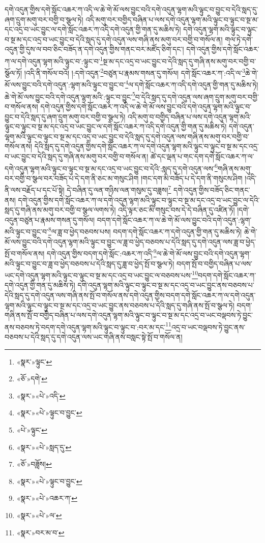 དགེ་འདུན་གྱིས་དགེ་སློང་འཆར་ཀ་འདི་ལ་ཆེ་གེ་མོ་ལས་བྱུང་བའི་དགེ་འདུན་ལྷག་མའི་ལྟུང་བ་བྱུང་བ་དེའི་སླད་དུ་ཞག་དྲུག་མགུ་བར་བགྱི་བ་སྩལ་ཏེ། འདི་མགུ་བར་བགྱིད་བཞིན་པ་ལས་དགེ་འདུན་ལྷག་མའི་ལྟུང་བ་ལྟུང་བ་སྔ་མ་དང་འདྲ་བ་ཡང་བྱུང་ལ་དགེ་སློང་འཆར་ཀ་འདི་དགེ་འདུན་གྱི་གན་དུ་མཆིས་ཏེ། དགེ་འདུན་ལྷག་མའི་ལྟུང་བ་ལྟུང་བ་སྔ་མ་དང་འདྲ་བ་ཡང་བྱུང་བ་དེའི་སླད་དུ་དགེ་འདུན་ལས་གཞི་ནས་མགུ་བར་བགྱི་བ་གསོལ་ན། གལ་ཏེ་དགེ་འདུན་གྱི་དུས་ལ་བབ་ཅིང་བཟོད་ན་དགེ་འདུན་གྱིས་གནང་བར་མཛོད་ཅིག་དང་། དགེ་འདུན་གྱིས་དགེ་སློང་འཆར་ཀ་ལ་དགེ་འདུན་ལྷག་མའི་ལྟུང་བ་:ལྟུང་བ་\footnote{«སྣར་»ལྟུང་}སྔ་མ་དང་འདྲ་བ་ཡང་བྱུང་བ་དེའི་སླད་དུ་གཞི་ནས་མགུ་བར་བགྱི་བ་སྩོལ་ཏོ། །འདི་ནི་གསོལ་བའོ། །:དགེ་འདུན་\footnote{«ཅོ་»དགེ་}བཙུན་པ་རྣམས་གསན་དུ་གསོལ། དགེ་སློང་འཆར་ཀ་:འདི་ལ་\footnote{«སྣར་»«པེ་»འདི་}ཆེ་གེ་མོ་ལས་བྱུང་བའི་དགེ་འདུན་:ལྷག་མའི་ལྟུང་བ་བྱུང་བ་\footnote{«སྣར་»«པེ་»ལྟུང་བ་བྱུང་}ལ་དགེ་སློང་འཆར་ཀ་འདི་དགེ་འདུན་གྱི་གན་དུ་མཆིས་ཏེ། ཆེ་གེ་མོ་ལས་བྱུང་བའི་དགེ་འདུན་ལྷག་མའི་:ལྟུང་བ་བྱུང་\footnote{«པེ་»ལྟུང་}བ་དེའི་སླད་དུ་དགེ་འདུན་ལས་ཞག་དྲུག་མགུ་བར་བགྱི་བ་གསོལ་ནས། དགེ་འདུན་གྱིས་དགེ་སློང་འཆར་ཀ་འདི་ལ་ཆེ་གེ་མོ་ལས་བྱུང་བའི་དགེ་འདུན་ལྷག་མའི་ལྟུང་བ་བྱུང་བ་དེའི་སླད་དུ་ཞག་དྲུག་མགུ་བར་བགྱི་བ་སྩལ་ཏེ། འདི་མགུ་བ་བགྱིད་བཞིན་པ་ལས་དགེ་འདུན་ལྷག་མའི་ལྟུང་བ་ལྟུང་བ་སྔ་མ་དང་འདྲ་བ་ཡང་བྱུང་ལ་དགེ་སློང་འཆར་ཀ་འདི་དགེ་འདུན་གྱི་གན་དུ་མཆིས་ཏེ། དགེ་འདུན་ལྷག་མའི་ལྟུང་བ་ལྟུང་བ་སྔ་མ་དང་འདྲ་བ་ཡང་བྱུང་བ་དེའི་སླད་དུ་དགེ་འདུན་ལས་གཞི་ནས་མགུ་བར་བགྱི་བ་གསོལ་ནས། དེའི་སླད་དུ་དགེ་འདུན་གྱིས་དགེ་སློང་འཆར་ཀ་ལ་དགེ་འདུན་ལྷག་མའི་ལྟུང་བ་ལྟུང་བ་སྔ་མ་དང་འདྲ་བ་ཡང་བྱུང་བ་དེའི་སླད་དུ་གཞི་ནས་མགུ་བར་བགྱི་བ་གསོལ་ན། ཚེ་དང་ལྡན་པ་གང་དག་དགེ་སློང་འཆར་ཀ་ལ་དགེ་འདུན་ལྷག་མའི་ལྟུང་བ་ལྟུང་བ་སྔ་མ་དང་འདྲ་བ་ཡང་བྱུང་བ་དེའི་:སླད་དུ་དགེ་འདུན་ལས་\footnote{«སྣར་»«པེ་»སླད་དུ་}གཞི་ནས་མགུ་བར་བགྱི་བ་སྩལ་བར་བཟོད་པ་དེ་དག་ནི་ཅང་མ་གསུང་ཤིག །གང་དག་མི་བཟོད་པ་དེ་དག་ནི་གསུངས་ཤིག །འདི་ནི་ལས་བརྗོད་པ་དང་པོ་སྟེ། དེ་བཞིན་དུ་ལན་གཉིས་ལན་གསུམ་དུ་བཟླས།\footnote{«ཅོ་»བཟློས།} དགེ་འདུན་གྱིས་བཟོད་ཅིང་གནང་ནས། དགེ་འདུན་གྱིས་དགེ་སློང་འཆར་ཀ་ལ་དགེ་འདུན་ལྷག་མའི་ལྟུང་བ་ལྟུང་བ་སྔ་མ་དང་འདྲ་བ་ཡང་བྱུང་ལ་དེའི་སླད་དུ་གཞི་ནས་མགུ་བར་བགྱི་བ་སྩལ་ལགས་ཏེ། འདི་ལྟར་ཅང་མི་གསུང་བས་དེ་དེ་བཞིན་དུ་འཛིན་ཏོ། །དགེ་འདུན་བཙུན་པ་རྣམས་གསན་དུ་གསོལ། བདག་དགེ་སློང་འཆར་ཀ་ལ་ཆེ་གེ་མོ་ལས་བྱུང་བའི་དགེ་འདུན་:ལྷག་མའི་ལྟུང་བ་བྱུང་བ་\footnote{«སྣར་»«པེ་»ལྟུང་བ་བྱུང་}ལ་ཟླ་བ་ཕྱེད་བཅབས་པས། བདག་དགེ་སློང་འཆར་ཀ་དགེ་འདུན་གྱི་གན་དུ་མཆིས་ཏེ། ཆེ་གེ་མོ་ལས་བྱུང་བའི་དགེ་འདུན་ལྷག་མའི་ལྟུང་བ་བྱུང་ལ་ཟླ་བ་ཕྱེད་བཅབས་པ་དེའི་སླད་དུ་དགེ་འདུན་ལས་ཟླ་བ་ཕྱེད་སྤོ་བ་གསོལ་ནས། དགེ་འདུན་གྱིས་བདག་དགེ་སློང་:འཆར་ཀ་འདི་\footnote{«སྣར་»«པེ་»འཆར་ཀ་}ལ་ཆེ་གེ་མོ་ལས་བྱུང་བའི་དགེ་འདུན་ལྷག་མའི་ལྟུང་བ་བྱུང་བ་ཟླ་བ་ཕྱེད་བཅབས་པ་དེའི་སླད་དུ་ཟླ་བ་ཕྱེད་སྤོ་བ་སྩལ་ཏེ། བདག་སྤོ་བ་བགྱིད་བཞིན་པ་ལས་ཡང་དགེ་འདུན་ལྷག་མའི་ལྟུང་བ་ལྟུང་བ་སྔ་མ་དང་འདྲ་བ་ཡང་བྱུང་ལ་བཅབས་པས་\footnote{«སྣར་»«པེ་»ལ་}བདག་དགེ་སློང་འཆར་ཀ་དགེ་འདུན་གྱི་གན་དུ་མཆིས་ཏེ། དགེ་འདུན་ལྷག་མའི་ལྟུང་བ་ལྟུང་བ་སྔ་མ་དང་འདྲ་བ་ཡང་བྱུང་ནས་བཅབས་པ་དེའི་སླད་དུ་དགེ་འདུན་ལས་གཞི་ནས་སྤོ་བ་གསོལ་ནས་དགེ་འདུན་གྱིས་བདག་དགེ་སློང་འཆར་ཀ་ལ་དགེ་འདུན་ལྷག་མའི་ལྟུང་བ་ལྟུང་བ་སྔ་མ་དང་འདྲ་བ་ཡང་བྱུང་ནས་བཅབས་པ་དེའི་སླད་དུ་གཞི་ནས་སྤོ་བ་སྩལ་ཏེ། བདག་གཞི་ནས་སྤོ་བ་བགྱིད་བཞིན་པ་ལས་དགེ་འདུན་ལྷག་མའི་ལྟུང་བ་ལྟུང་བ་སྔ་མ་དང་འདྲ་བ་ཡང་བལྡབས་ཏེ་བྱུང་ནས་བཅབས་ཏེ་བདག་དགེ་འདུན་ལྷག་མའི་ལྟུང་བ་ལྟུང་བ་:བར་མ་དང་\footnote{«སྣར་»བར་མ་བ་}འདྲ་བ་ཡང་བལྡབས་ཏེ་བྱུང་ནས་བཅབས་པ་དེའི་སླད་དུ་དགེ་འདུན་ལས་ཡང་གཞི་ནས་བསླང་སྟེ་སྤོ་བ་གསོལ་ན། 